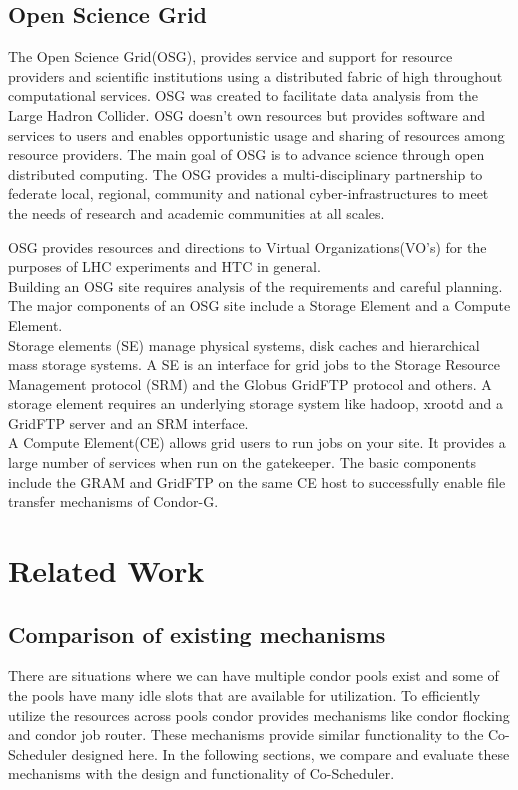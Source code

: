 \documentclass[ms,electronic,double]{nuthesis}
\begin{document}
\section{Open Science Grid} The Open Science Grid(OSG), provides service and support 
for resource providers and scientific institutions using a distributed fabric of 
high throughout computational services. OSG was created to facilitate data analysis from the 
Large Hadron Collider\cite{osg}. OSG doesn't own resources but provides software and services to 
users and enables opportunistic usage and sharing of resources among resource providers.
The main goal of OSG is to advance science through open distributed computing. 
The OSG provides a multi-disciplinary partnership to federate local, regional, community and 
national cyber-infrastructures to meet the needs of research and academic communities at all scales.

OSG provides resources and directions to Virtual Organizations(VO's) for the purposes of LHC experiments
and HTC in general. \\

Building an OSG site requires analysis of the requirements and careful planning. The major 
components of an OSG site include a Storage Element and a Compute Element. \\
Storage elements (SE) manage physical systems, disk caches and hierarchical mass storage 
systems. A SE is an interface for grid jobs to the Storage Resource Management protocol (SRM) and the Globus 
GridFTP protocol and others. A storage element requires an underlying storage system like hadoop, xrootd
and a GridFTP server and an SRM interface.\\
A Compute Element(CE) allows grid users to run jobs on your site. It provides a 
large number of services when run on the gatekeeper. The basic components include 
the GRAM and GridFTP on the same CE host to successfully enable file transfer 
mechanisms of Condor-G.\\


\chapter{Related Work}

\section{Comparison of existing mechanisms}
There are situations where we can have multiple condor pools exist and some of 
the pools have many idle slots that are available for utilization. To efficiently utilize the resources across pools condor provides 
mechanisms like condor flocking and condor job router. These mechanisms 
provide similar functionality to the Co-Scheduler designed here. In the following sections, we compare 
and evaluate these mechanisms with the design and functionality of Co-Scheduler.
\end{document}
